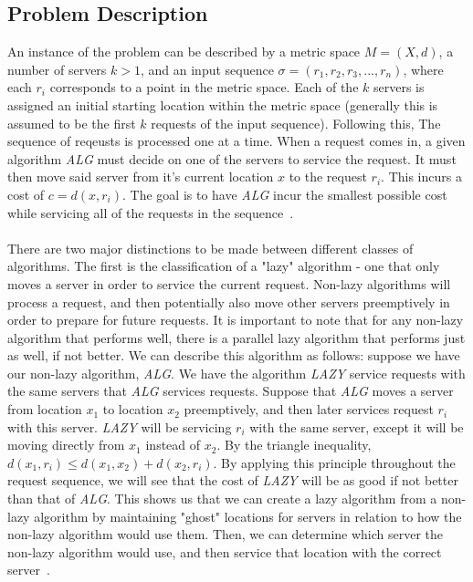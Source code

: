 \subsection{Problem Description}
\label{sec:desc}
An instance of the \KS problem can be described by a metric space $M = (X, d)$, a number of servers $k>1$, and an input sequence $\sigma = (r_1, r_2, r_3, ..., r_n)$, where each $r_i$ corresponds to a point in the metric space. Each of the $k$ servers is assigned an initial starting location within the metric space (generally this is assumed to be the first $k$ requests of the input sequence). Following this, The sequence of reqeusts is processed one at a time. When a request comes in, a given algorithm \textit{ALG} must decide on one of the servers to service the request. It must then move said server from it's current location $x$ to the request $r_i$. This incurs a cost of $c = d(x, r_i)$. The goal is to have \textit{ALG} incur the smallest possible cost while servicing all of the requests in the sequence~\cite{OnlineComp1998}.
\\ \\
There are two major distinctions to be made between different classes of algorithms. The first is the classification of a "lazy" algorithm - one that only moves a server in order to service the current request. Non-lazy algorithms will process a request, and then potentially also move other servers preemptively in order to prepare for future requests. It is important to note that for any non-lazy algorithm that performs well, there is a parallel lazy algorithm that performs just as well, if not better. We can describe this algorithm as follows: suppose we have our non-lazy algorithm, \textit{ALG}. We have the algorithm \textit{LAZY} service requests with the same servers that \textit{ALG} services requests. Suppose that \textit{ALG} moves a server from location $x_1$ to location $x_2$ preemptively, and then later services request $r_i$ with this server. \textit{LAZY} will be servicing $r_i$ with the same server, except it will be moving directly from $x_1$ instead of $x_2$. By the triangle inequality, $d(x_1, r_i) \leq d(x_1, x_2) + d(x_2, r_i)$. By applying this principle throughout the request sequence, we will see that the cost of \textit{LAZY} will be as good if not better than that of \textit{ALG}. This shows us that we can create a lazy algorithm from a non-lazy algorithm by maintaining "ghost" locations for servers in relation to how the non-lazy algorithm would use them. Then, we can determine which server the non-lazy algorithm would use, and then service that location with the correct server~\cite{OnlineComp1998}.
